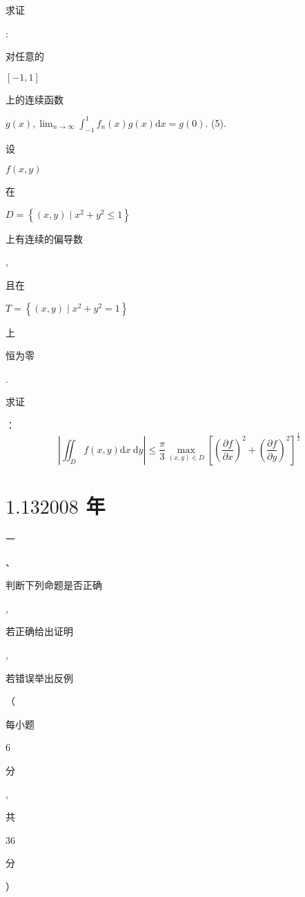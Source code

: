 \documentclass[10pt]{article}
\begin{document}
\begin{CJK}{UTF8}{mj}求证\end{CJK}: \begin{CJK}{UTF8}{mj}对任意的\end{CJK} $[-1,1]$ \begin{CJK}{UTF8}{mj}上的连续函数\end{CJK} $g(x), \lim _{n \rightarrow \infty} \int_{-1}^{1} f_{n}(x) g(x) \mathrm{d} x=g(0)$. (5). \begin{CJK}{UTF8}{mj}设\end{CJK} $f(x, y)$ \begin{CJK}{UTF8}{mj}在\end{CJK} $D=\left\{(x, y) \mid x^{2}+y^{2} \leqslant 1\right\}$ \begin{CJK}{UTF8}{mj}上有连续的偏导数\end{CJK}, \begin{CJK}{UTF8}{mj}且在\end{CJK} $T=\left\{(x, y) \mid x^{2}+y^{2}=1\right\}$ \begin{CJK}{UTF8}{mj}上\end{CJK} \begin{CJK}{UTF8}{mj}恒为零\end{CJK}. \begin{CJK}{UTF8}{mj}求证\end{CJK}：
$$
\left|\iint_{D} f(x, y) \mathrm{d} x \mathrm{~d} y\right| \leqslant \frac{\pi}{3} \max _{(x, y) \in D}\left[\left(\frac{\partial f}{\partial x}\right)^{2}+\left(\frac{\partial f}{\partial y}\right)^{2}\right]^{\frac{1}{2}}
$$

\section{$1.132008$ 年}
\begin{CJK}{UTF8}{mj}一\end{CJK}、\begin{CJK}{UTF8}{mj}判断下列命题是否正确\end{CJK}, \begin{CJK}{UTF8}{mj}若正确给出证明\end{CJK}, \begin{CJK}{UTF8}{mj}若错误举出反例\end{CJK}（\begin{CJK}{UTF8}{mj}每小题\end{CJK} 6 \begin{CJK}{UTF8}{mj}分\end{CJK}, \begin{CJK}{UTF8}{mj}共\end{CJK} 36 \begin{CJK}{UTF8}{mj}分\end{CJK}）
\end{document}
